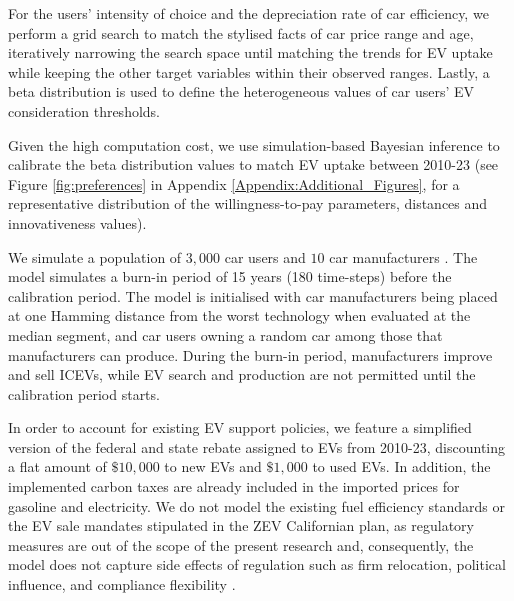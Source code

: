 \documentclass[12pt]{article}
\begin{document}
	For the users' intensity of choice and the depreciation rate of car efficiency, we perform a grid search to match the stylised facts of car price range and age, iteratively narrowing the search space until matching the trends for EV uptake while keeping the other target variables within their observed ranges. Lastly, a beta distribution is used to define the heterogeneous values of car users' EV consideration thresholds.

    Given the high computation cost, we use simulation-based Bayesian inference \citep{papamakarios2016fast,cranmer2020frontier, dyer2024black} to calibrate the beta distribution values to match EV uptake between 2010-23 (see Figure \ref{fig:preferences} in Appendix \ref{Appendix:Additional_Figures}, for a representative distribution of the willingness-to-pay parameters, distances and innovativeness values). %

	We simulate a population of $3,000$ car users and $10$ car manufacturers \citep{Grieco2024MarketPower}. The model simulates a burn-in period of 15 years (180 time-steps) before the calibration period. The model is initialised with car manufacturers being placed at one Hamming distance from the worst technology when evaluated at the median segment, and car users owning a random car among those that manufacturers can produce. During the burn-in period, manufacturers improve and sell ICEVs, while EV search and production are not permitted until the calibration period starts.

	In order to account for existing EV support policies, we feature a simplified version of the federal and state rebate assigned to EVs \citep{CARB1990LEV, CARB1990hearing,CARB1990proposed} from 2010-23, discounting a flat amount of $\$10,000$ to new EVs and $\$1,000$ to used EVs. In addition, the implemented carbon taxes are already included in the imported prices for gasoline and electricity. We do not model the existing fuel efficiency standards or the EV sale mandates stipulated in the ZEV Californian plan, as regulatory measures are out of the scope of the present research and, consequently, the model does not capture side effects of regulation such as firm relocation, political influence, and compliance flexibility \citep{Wesseling2014Political,wesseling2015exploring}.
\end{document}

